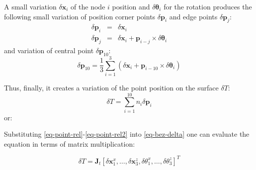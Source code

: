 \documentclass{egpubl}
\begin{document}
A small variation $\delta \mathbf{x}_i$ of the node $i$ position and $\delta \mathbf{\theta}_i$ for the rotation produces the following small variation of position corner points $\delta \mathbf{p}_i$ and edge points $\delta \mathbf{p}_j$:
%
\begin{eqnarray}\label{eq-point-rel}
    \delta \mathbf{p}_i & = & \delta \mathbf{x}_i \\
    \delta \mathbf{p}_j & = & \delta \mathbf{x}_i +  \mathbf{p}_{i-j} \times \delta \mathbf{\theta}_i
\end{eqnarray}
%
and variation of central point $\delta \mathbf{p}_{10}$:
%
\begin{equation}\label{eq-point-rel2}
    \delta \mathbf{p}_{10} = \frac{1}{3} \sum_{i=1}^3 \left(
    \delta \mathbf{x}_i + \mathbf{p}_{i-10} \times \delta \mathbf{\theta}_i \right)
\end{equation}

Thus, finally, it creates a variation of the point position on the surface $\delta T$:
%
\begin{equation}\label{eq-bez-delta}
    \delta T = \sum_{i=1}^{10} n_i  \delta \mathbf{p}_i
\end{equation}
%
or:


Substituting \eqref{eq-point-rel}-\eqref{eq-point-rel2} into \eqref{eq-bez-delta} 
one can evaluate the equation in terms of matrix multiplication:

\begin{equation}
    \delta T = \mathbf{J}_t \left[ \delta\mathbf{x}^x_1, \hdots, \delta\mathbf{x}^z_3,
        \delta\theta^x_1, \ldots, \delta\theta^z_3 \right]^T
\end{equation}

%
\end{document}
